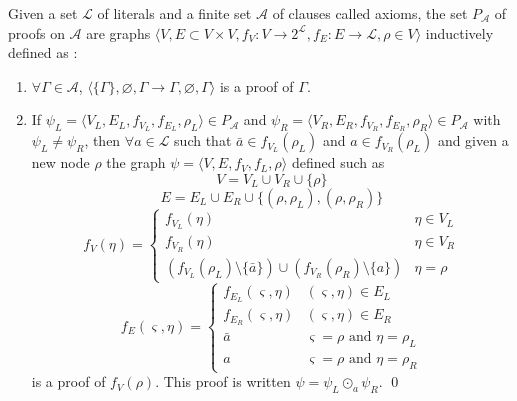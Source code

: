 \documentclass{llncs}
\newcommand{\dual}[1]{{\ensuremath{\bar{#1}}}}
\begin{document}
\begin{definition}[Proof] \label{def:proof}
Given a set $\mathcal{L}$ of literals and a finite set $\mathcal{A}$ of clauses called axioms, the
set $P_\mathcal{A}$ of proofs on $\mathcal{A}$ are graphs $\langle V, E \subset V \times V, f_V : V
\longrightarrow 2^\mathcal{L}, f_E : E \longrightarrow \mathcal{L}, \rho \in V \rangle$ inductively
defined as :
\begin{enumerate}[nosep]
  \item $\forall \Gamma \in \mathcal{A}$, $\langle \{\Gamma\}, \varnothing, \Gamma
    \rightarrow \Gamma, \varnothing, \Gamma \rangle$ is a proof of $\Gamma$.
  \item If $\psi_L = \langle V_L, E_L, f_{V_L}, f_{E_L}, \rho_L \rangle \in P_\mathcal{A}$ and
    $\psi_R = \langle V_R, E_R, f_{V_R}, f_{E_R}, \rho_R \rangle \in P_\mathcal{A}$ with $\psi_L
    \neq \psi_R$, then $\forall a \in \mathcal{L}$ such that $\dual{a} \in f_{V_L}(\rho_L)$ and $a
    \in f_{V_R}(\rho_L)$ and given a new node $\rho$ the graph $\psi = \langle V,E, f_V, f_L, \rho
    \rangle$ defined such as
    \begin{equation*}
      V = V_L \cup V_R \cup \{\rho\}
    \end{equation*}
    \begin{equation*}
      E = E_L \cup E_R \cup \{(\rho,\rho_L),(\rho,\rho_R)\}
    \end{equation*}
    \begin{equation*}
      f_V(\eta) = \begin{cases}
        f_{V_L}(\eta) & \eta \in V_L \\
        f_{V_R}(\eta) & \eta \in V_R \\
        (f_{V_L}(\rho_L) \setminus \{\dual{a}\}) \cup (f_{V_R}(\rho_R) \setminus \{a\}) &
          \eta = \rho
      \end{cases}
    \end{equation*}
    \begin{equation*}
      f_E(\varsigma,\eta) = \begin{cases}
        f_{E_L}(\varsigma,\eta) & (\varsigma,\eta) \in E_L \\
        f_{E_R}(\varsigma,\eta) & (\varsigma,\eta) \in E_R \\
        \dual{a} & \varsigma = \rho \text{ and } \eta = \rho_L \\
        a        & \varsigma = \rho \text{ and } \eta = \rho_R
      \end{cases}
    \end{equation*}
    is a proof of $f_V(\rho)$. This proof is written $\psi = \psi_L \odot_a \psi_R$.
  \qed
\end{enumerate}
\end{definition}
\end{document}
